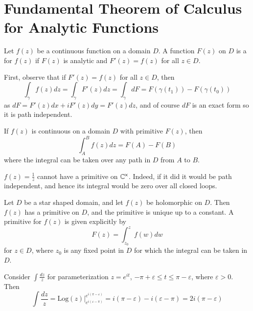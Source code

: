 \documentclass[12pt, a4paper, oneside, openright, titlepage]{book}
\begin{document}
\section{Fundamental Theorem of Calculus for Analytic Functions}

\begin{defn}
    Let $f(z)$ be a continuous function on a domain $D$. A function $F(z)$ on $D$ is a  for $f(z)$ if $F(z)$ is analytic and $F'(z) = f(z)$ for all $z \in D$.
\end{defn}

First, observe that if $F'(z) = f(z)$ for all $z \in D$, then \begin{equation*}
    \int_{\gamma}f(z)dz = \int_{\gamma}F'(z)dz = \int_{\gamma}dF = F(\gamma(t_1)) - F(\gamma(t_0))
\end{equation*}
as $dF = F'(z)dx+iF'(z)dy = F'(z)dz$, and of course $dF$ is an exact form so it is path independent. 

\begin{thm}
    If $f(z)$ is continuous on a domain $D$ with primitive $F(z)$, then \begin{equation*}
        \int_A^Bf(z)dz = F(A) - F(B)
    \end{equation*}
    where the integral can be taken over any path in $D$ from $A$ to $B$.
\end{thm}

\begin{rmk}
    $f(z) = \frac{1}{z}$ cannot have a primitive on $\mathbb C^{\times}$. Indeed, if it did it would be path independent, and hence its integral would be zero over all closed loops.
\end{rmk}

\begin{thm}
    Let $D$ be a star shaped domain, and let $f(z)$ be holomorphic on $D$. Then $f(z)$ has a primitive on $D$, and the primitive is unique up to a constant. A primitive for $f(z)$ is given explicitly by \begin{equation*}
        F(z) = \int_{z_0}^{z}f(w)dw
    \end{equation*}
    for $z \in D$, where $z_0$ is any fixed point in $D$ for which the integral can be taken in $D$.
\end{thm}


\begin{eg}
    Consider $\int \frac{dz}{z}$ for parameterization $z = e^{it}$, $-\pi + \varepsilon \leq t \leq \pi - \varepsilon$, where $\varepsilon > 0$. Then \begin{equation*}
        \int\frac{dz}{z} = \text{Log}(z)\vert_{e^{i(\varepsilon-\pi)}}^{e^{i(\pi-\varepsilon)}} = i(\pi-\varepsilon) - i(\varepsilon - \pi) = 2i(\pi-\varepsilon)
    \end{equation*}
\end{eg}
\end{document}

